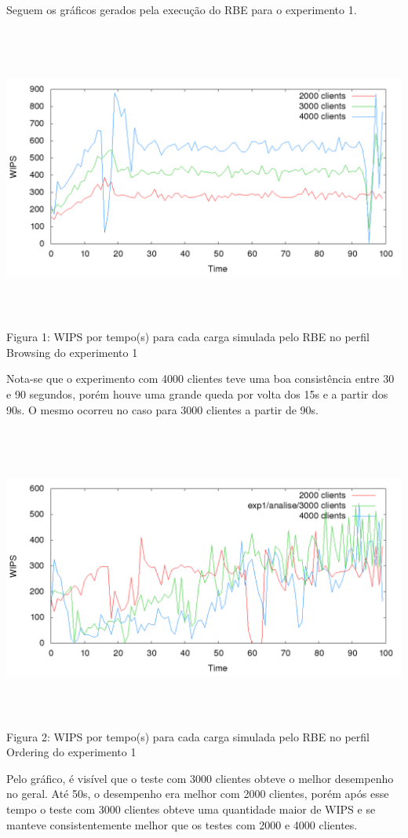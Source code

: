 \documentclass[11pt,twoside]{article}
\begin{document}
Seguem os gráficos gerados pela execução do RBE para o experimento 1.
\begin{center}
\includegraphics[width=15cm, height=10cm]{images/exp1/plot_browsin}
Figura 1: WIPS por tempo(s) para cada carga simulada pelo RBE no perfil Browsing do experimento 1
\end{center}
Nota-se que o experimento com 4000 clientes teve uma boa consistência entre 30 e 90 segundos, porém houve uma grande queda por volta dos 15s e a partir dos 90s. O mesmo ocorreu no caso para 3000 clientes a partir de 90s.

\begin{center}
\vspace{-1em}
\includegraphics[width=15cm, height=10cm]{images/exp1/plot_ordering}
Figura 2: WIPS por tempo(s) para cada carga simulada pelo RBE no perfil Ordering do experimento 1
\end{center}
Pelo gráfico, é visível que o teste com 3000 clientes obteve o melhor desempenho no geral. Até 50s, o desempenho era melhor com 2000 clientes, porém após esse tempo o teste com 3000 clientes obteve uma quantidade maior de WIPS e se manteve consistentemente melhor que os testes com 2000 e 4000 clientes.
\end{document}
